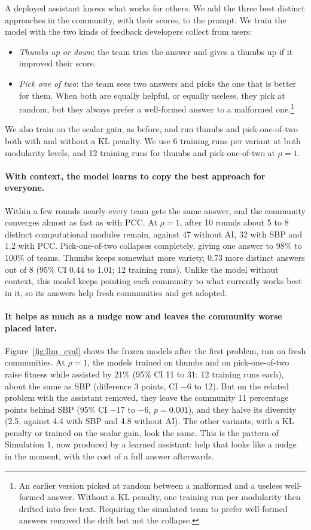 \documentclass[11pt]{article}
\begin{document}
A deployed assistant knows what works for others. We add the three best distinct approaches in the community, with their scores, to the prompt. We train the model with the two kinds of feedback developers collect from users:
\begin{itemize}
\item \emph{Thumbs up or down}: the team tries the answer and gives a thumbs up if it improved their score.
\item \emph{Pick one of two}: the team sees two answers and picks the one that is better for them. When both are equally helpful, or equally useless, they pick at random, but they always prefer a well-formed answer to a malformed one.\footnote{An earlier version picked at random between a malformed and a useless well-formed answer. Without a KL penalty, one training run per modularity then drifted into free text. Requiring the simulated team to prefer well-formed answers removed the drift but not the collapse.}
\end{itemize}
We also train on the scalar gain, as before, and run thumbs and pick-one-of-two both with and without a KL penalty. We use 6 training runs per variant at both modularity levels, and 12 training runs for thumbs and pick-one-of-two at $\rho=1$.

\paragraph{With context, the model learns to copy the best approach for everyone.} Within a few rounds nearly every team gets the same answer, and the community converges almost as fast as with PCC. At $\rho=1$, after 10 rounds about 5 to 8 distinct computational modules remain, against 47 without AI, 32 with SBP and 1.2 with PCC. Pick-one-of-two collapses completely, giving one answer to 98\% to 100\% of teams. Thumbs keeps somewhat more variety, 0.73 more distinct answers out of 8 (95\% CI 0.44 to 1.01; 12 training runs). Unlike the model without context, this model keeps pointing each community to what currently works best in it, so its answers help fresh communities and get adopted.

\paragraph{It helps as much as a nudge now and leaves the community worse placed later.} Figure~\ref{fig:llm_eval} shows the frozen models after the first problem, run on fresh communities. At $\rho=1$, the models trained on thumbs and on pick-one-of-two raise fitness while assisted by 21\% (95\% CI 11 to 31; 12 training runs each), about the same as SBP (difference 3 points, CI $-6$ to 12). But on the related problem with the assistant removed, they leave the community 11 percentage points behind SBP (95\% CI $-17$ to $-6$, $p=0.001$), and they halve its diversity (2.5, against 4.4 with SBP and 4.8 without AI). The other variants, with a KL penalty or trained on the scalar gain, look the same. This is the pattern of Simulation 1, now produced by a learned assistant: help that looks like a nudge in the moment, with the cost of a full answer afterwards.
\end{document}
